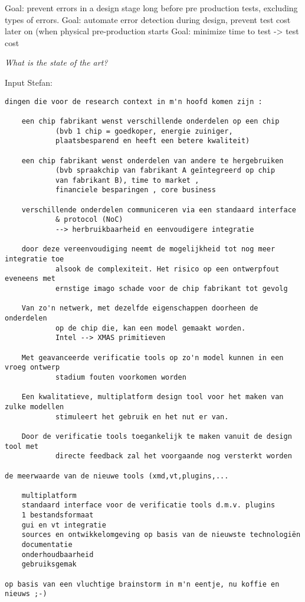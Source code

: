 Goal: prevent errors in a design stage long before pre production tests, excluding types of errors.
Goal: automate error detection during design, prevent test cost later on (when physical pre-production starts
Goal: minimize time to test -> test cost

\textit{What is the state of the art?}




Input Stefan:
{\small
\begin{lstlisting}
dingen die voor de research context in m'n hoofd komen zijn :

    een chip fabrikant wenst verschillende onderdelen op een chip 
    		(bvb 1 chip = goedkoper, energie zuiniger, 
    		plaatsbesparend en heeft een betere kwaliteit)

    een chip fabrikant wenst onderdelen van andere te hergebruiken 
    		(bvb spraakchip van fabrikant A geïntegreerd op chip 
    		van fabrikant B), time to market , 
    		financiele besparingen , core business

    verschillende onderdelen communiceren via een standaard interface 
    		& protocol (NoC) 
    		--> herbruikbaarheid en eenvoudigere integratie

    door deze vereenvoudiging neemt de mogelijkheid tot nog meer integratie toe 
    		alsook de complexiteit. Het risico op een ontwerpfout eveneens met 
    		ernstige imago schade voor de chip fabrikant tot gevolg

    Van zo'n netwerk, met dezelfde eigenschappen doorheen de onderdelen 
    		op de chip die, kan een model gemaakt worden. 
    		Intel --> XMAS primitieven
    		
    Met geavanceerde verificatie tools op zo'n model kunnen in een vroeg ontwerp 
    		stadium fouten voorkomen worden
    		
    Een kwalitatieve, multiplatform design tool voor het maken van zulke modellen 
    		stimuleert het gebruik en het nut er van.
    		
    Door de verificatie tools toegankelijk te maken vanuit de design tool met 
    		directe feedback zal het voorgaande nog versterkt worden

de meerwaarde van de nieuwe tools (xmd,vt,plugins,...

    multiplatform
    standaard interface voor de verificatie tools d.m.v. plugins
    1 bestandsformaat
    gui en vt integratie
    sources en ontwikkelomgeving op basis van de nieuwste technologiën
    documentatie 
    onderhoudbaarheid
    gebruiksgemak

op basis van een vluchtige brainstorm in m'n eentje, nu koffie en nieuws ;-)
\end{lstlisting}
}

